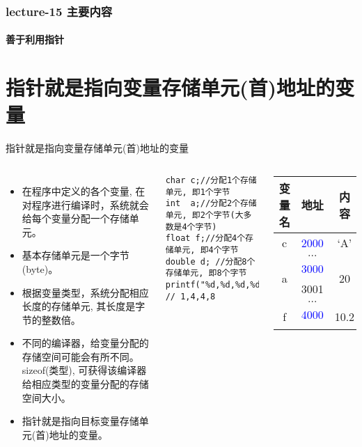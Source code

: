 \begin{frame}[shrink]
  \frametitle{lecture-15 主要内容}
  \framesubtitle{善于利用指针}
  \tableofcontents
\end{frame}

\section{指针就是指向变量存储单元(首)地址的变量}

\begin{frame}{指针就是指向变量存储单元(首)地址的变量}

\begin{columns}[T]
\begin{itemize}
\item 在程序中定义的各个变量, 在对程序进行编译时，系统就会给每个变量分配一个存储单元。
\item 基本存储单元是一个字节(byte)。
\item 根据变量类型，系统分配相应长度的存储单元, 其长度是字节的整数倍。
\item 不同的编译器，给变量分配的存储空间可能会有所不同。sizeof(类型), 可获得该编译器给相应类型的变量分配的存储空间大小。
\item 指针就是指向目标变量存储单元(首)地址的变量。
\end{itemize}
\begin{lstlisting}
char c;//分配1个存储单元, 即1个字节
int  a;//分配2个存储单元, 即2个字节(大多数是4个字节)
float f;//分配4个存储单元, 即4个字节
double d; //分配8个存储单元, 即8个字节
printf("%d,%d,%d,%d\n",sizeof(char),sizeof(int),sizeof(float),sizeof(double)); 
// 1,4,4,8
\end{lstlisting}
\begin{tabular}{|c|c|c|}
	\hline 
	\textbf{变量名} & \textbf{地址} & \textbf{内容} \\ 
	\hline 
	c & \textcolor{blue}{2000} & `A' \\ 
	\hline 
	& $\dots$ &  \\ 
	\hline 
	\multirow{2}{*}{a} & \textcolor{blue}{3000} & \multirow{2}{*}{20} \\ \cline{2-2} 
	& 3001 &  \\ 
	\hline 
	& $\dots$ &  \\ 
	\hline 
	\multirow{4}{*}{f} & \textcolor{blue}{4000} & \multirow{4}{*}{10.2}  \\ \cline{2-2} 

\end{tabular}
\end{columns}
\end{frame}
